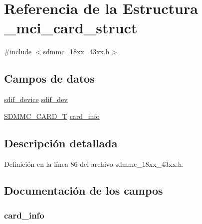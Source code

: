 \hypertarget{struct__mci__card__struct}{}\section{Referencia de la Estructura \+\_\+mci\+\_\+card\+\_\+struct}
\label{struct__mci__card__struct}


{\ttfamily \#include $<$sdmmc\+\_\+18xx\+\_\+43xx.\+h$>$}

\subsection*{Campos de datos}
\begin{DoxyCompactItemize}
\item 
\hyperlink{group___s_d_i_f__18_x_x__43_x_x_ga14a605aa797cde1201ae414437a32292}{sdif\+\_\+device} \hyperlink{struct__mci__card__struct_a874100e24648dab78643d19778685b02}{sdif\+\_\+dev}
\item 
\hyperlink{struct_s_d_m_m_c___c_a_r_d___t}{S\+D\+M\+M\+C\+\_\+\+C\+A\+R\+D\+\_\+T} \hyperlink{struct__mci__card__struct_ae2fd0c303f76a8614f0a1d3b8b173d1f}{card\+\_\+info}
\end{DoxyCompactItemize}


\subsection{Descripción detallada}


Definición en la línea 86 del archivo sdmmc\+\_\+18xx\+\_\+43xx.\+h.



\subsection{Documentación de los campos}
\subsubsection[{\texorpdfstring{card\+\_\+info}{card_info}}]{ card\+\_\+info}\hypertarget{struct__mci__card__struct_ae2fd0c303f76a8614f0a1d3b8b173d1f}{}\label{struct__mci__card__struct_ae2fd0c303f76a8614f0a1d3b8b173d1f}


